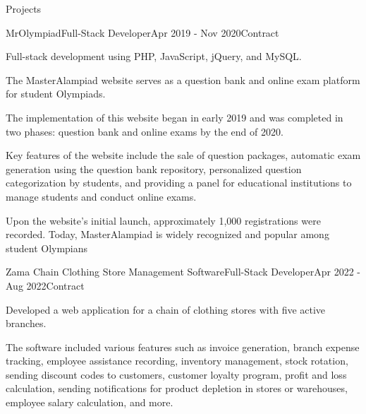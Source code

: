 \documentclass[]{kyvernitis-resume}
\begin{document}
\begin{section}{Projects}
    \begin{subsection}{MrOlympiad}{Full-Stack Developer}{Apr 2019 - Nov 2020}{Contract}{}
     		\item Full-stack development using PHP, JavaScript, jQuery, and MySQL.
		\item	The MasterAlampiad website serves as a question bank and online exam platform for student Olympiads.
		\item	The implementation of this website began in early 2019 and was completed in two phases: question bank and online exams by the end of 2020.
		\item	Key features of the website include the sale of question packages, automatic exam generation using the question bank repository, personalized question categorization by students, and providing a panel for educational institutions to manage students and conduct online exams.
		\item	Upon the website's initial launch, approximately 1,000 registrations were recorded. Today, MasterAlampiad is widely recognized and popular among student Olympians

    \end{subsection}
    \begin{subsection}{Zama Chain Clothing Store Management Software}{Full-Stack Developer}{Apr 2022 - Aug 2022}{Contract}{}
     		\item Developed a web application for a chain of clothing stores with five active branches.
		\item The software included various features such as invoice generation, branch expense tracking, employee assistance recording, inventory management, stock rotation, sending discount codes to customers, customer loyalty program, profit and loss calculation, sending notifications for product depletion in stores or warehouses, employee salary calculation, and more.

    \end{subsection}


\end{section}
\end{document}
